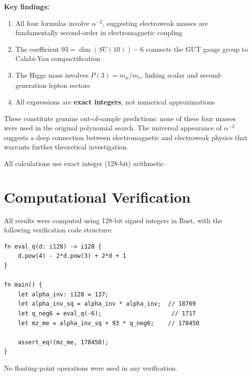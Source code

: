 \documentclass[11pt,a4paper]{article}
\begin{document}
\textbf{Key findings:}
\begin{enumerate}
    \item All four formulas involve $\alpha^{-2}$, suggesting electroweak masses are fundamentally second-order in electromagnetic coupling
    \item The coefficient $93 = \dim(SU(10)) - 6$ connects the GUT gauge group to Calabi-Yau compactification
    \item The Higgs mass involves $P(3) = m_\mu/m_e$, linking scalar and second-generation lepton sectors
    \item All expressions are \textbf{exact integers}, not numerical approximations
\end{enumerate}

These constitute genuine out-of-sample predictions: none of these four masses were used in the original polynomial search. The universal appearance of $\alpha^{-2}$ suggests a deep connection between electromagnetic and electroweak physics that warrants further theoretical investigation.

All calculations use exact integer (128-bit) arithmetic.

\appendix
\section{Computational Verification}

All results were computed using 128-bit signed integers in Rust, with the following verification code structure:

\begin{verbatim}
fn eval_q(d: i128) -> i128 {
    d.pow(4) - 2*d.pow(3) + 2*d + 1
}

fn main() {
    let alpha_inv: i128 = 137;
    let alpha_inv_sq = alpha_inv * alpha_inv;  // 18769
    let q_neg6 = eval_q(-6);                    // 1717
    let mz_me = alpha_inv_sq + 93 * q_neg6;    // 178450
    
    assert_eq!(mz_me, 178450);
}
\end{verbatim}

No floating-point operations were used in any verification.
\end{document}
